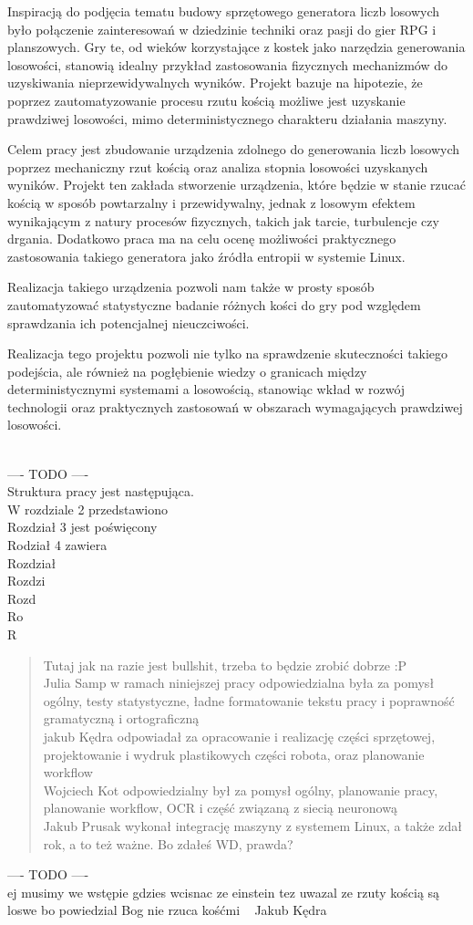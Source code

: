 Inspiracją do podjęcia tematu budowy sprzętowego generatora liczb losowych było połączenie zainteresowań w dziedzinie techniki oraz pasji do gier RPG i planszowych.
Gry te, od wieków korzystające z kostek jako narzędzia generowania losowości, stanowią idealny przykład zastosowania fizycznych mechanizmów do uzyskiwania nieprzewidywalnych wyników.
Projekt bazuje na hipotezie, że poprzez zautomatyzowanie procesu rzutu kością możliwe jest uzyskanie prawdziwej losowości, mimo deterministycznego charakteru działania maszyny.

Celem pracy jest zbudowanie urządzenia zdolnego do generowania liczb losowych poprzez mechaniczny rzut kością oraz analiza stopnia losowości uzyskanych wyników.
Projekt ten zakłada stworzenie urządzenia, które będzie w stanie rzucać kością w sposób powtarzalny i przewidywalny,
jednak z losowym efektem wynikającym z natury procesów fizycznych, takich jak tarcie, turbulencje czy drgania.
Dodatkowo praca ma na celu ocenę możliwości praktycznego zastosowania takiego generatora jako źródła entropii w systemie Linux.

Realizacja takiego urządzenia pozwoli nam także w prosty sposób zautomatyzować statystyczne badanie różnych kości do gry pod względem sprawdzania ich potencjalnej nieuczciwości.

Realizacja tego projektu pozwoli nie tylko na sprawdzenie skuteczności takiego podejścia,
ale również na pogłębienie wiedzy o granicach między deterministycznymi systemami a losowością,
stanowiąc wkład w rozwój technologii oraz praktycznych zastosowań w obszarach wymagających prawdziwej losowości.

\\
---- TODO ---- \\
Struktura pracy jest następująca. \\
W rozdziale 2 przedstawiono \\
Rozdział 3 jest poświęcony \\
Rodział 4 zawiera \\
Rozdział \\
Rozdzi \\
Rozd \\
Ro \\
R \\

\begin{quote}
    Tutaj jak na razie jest bullshit, trzeba to będzie zrobić dobrze :P \\
    Julia Samp w ramach niniejszej pracy odpowiedzialna była za pomysł ogólny, testy statystyczne, ładne formatowanie tekstu pracy i poprawność gramatyczną i ortograficzną \\
    jakub Kędra odpowiadał za opracowanie i realizację części sprzętowej, projektowanie i wydruk plastikowych części robota, oraz planowanie workflow \\
    Wojciech Kot odpowiedzialny był za pomysł ogólny, planowanie pracy, planowanie workflow, OCR i część związaną z siecią neuronową \\
    Jakub Prusak wykonał integrację maszyny z systemem Linux, a także zdał rok, a to też ważne. Bo zdałeś WD, prawda? \\
\end{quote}


---- TODO ---- \\
ej musimy we wstępie gdzies wcisnac ze einstein tez uwazal ze rzuty kością są loswe bo powiedzial Bog nie rzuca kośćmi ~ Jakub Kędra


